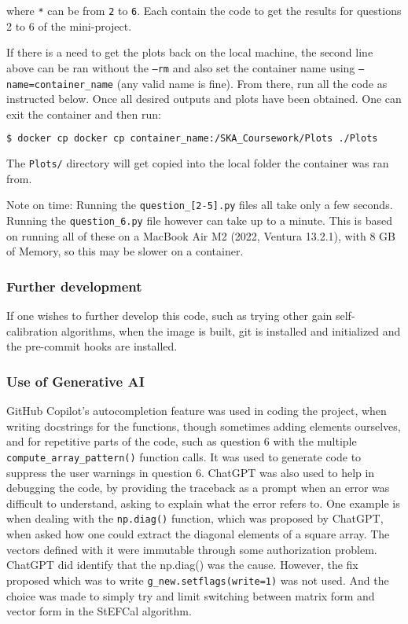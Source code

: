 \documentclass[12pt]{report} %
\begin{document}
where \texttt{*} can be from \texttt{2} to \texttt{6}. Each contain the code to get the results for questions 2 to 6 of the mini-project.

If there is a need to get the plots back on the local machine, the second line above can be ran without the \texttt{--rm} and also set the container name using \texttt{--name=container\_name} (any valid name is fine). From there, run all the code as instructed below. Once all desired outputs and plots have been obtained. One can exit the container and then run:


\begin{lstlisting}[language=bash, caption={Copying the plots back to the local machine.}]
$ docker cp docker cp container_name:/SKA_Coursework/Plots ./Plots
\end{lstlisting}

The \texttt{Plots/} directory will get copied into the local folder the container was ran from.

Note on time: Running the \texttt{question\_[2-5].py} files all take only a few seconds. Running the \texttt{question\_6.py} file however can take up to a minute. This is based on running all of these on a MacBook Air M2 (2022, Ventura 13.2.1), with 8 GB of Memory, so this may be slower on a container.


\subsubsection{Further development}

If one wishes to further develop this code, such as trying other gain self-calibration algorithms, when the image is built, git is installed and initialized and the pre-commit hooks are installed.

\subsubsection{Use of Generative AI}

GitHub Copilot's autocompletion feature was used in coding the project, when writing docstrings for the functions, though sometimes adding elements ourselves, and for repetitive parts of the code, such as question 6 with the multiple \texttt{compute\_array\_pattern()} function calls. It was used to generate code to suppress the user warnings in question 6.
ChatGPT was also used to help in debugging the code, by providing the traceback as a prompt when an error was difficult to understand, asking to explain what the error refers to. One example is when dealing with the \texttt{np.diag()} function, which was proposed by ChatGPT, when asked how one could extract the diagonal elements of a square array. The vectors defined with it were immutable through some authorization problem. ChatGPT did identify that the np.diag() was the cause. However, the fix proposed which was to write \texttt{g\_new.setflags(write=1)} was not used. And the choice was made to simply try and limit switching between matrix form and vector form in the StEFCal algorithm.







\end{document}
